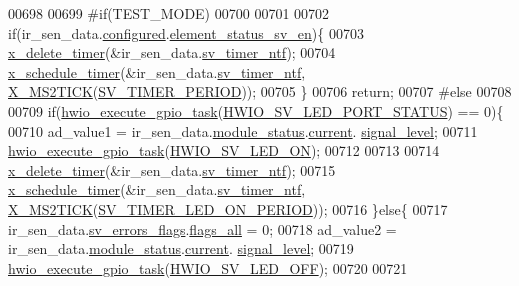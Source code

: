 \begin{DoxyCode}
00698 
00699 \textcolor{preprocessor}{#if(TEST\_MODE)}
00700 
00701 
00702     \textcolor{keywordflow}{if}(ir\_sen\_data.\hyperlink{a00023_a94b2d1f6ea4ab334c74d24984dd27843}{configured}.\hyperlink{a00021_afeb3f74725269028a60926f98890c22b}{element\_status\_sv\_en})\{
00703     \hyperlink{a00036_ab69e9af4cfa717e870d587906283635c}{x\_delete\_timer}(&ir\_sen\_data.\hyperlink{a00023_ada91b200053f2d93e3639dc4ee3415b4}{sv\_timer\_ntf});
00704     \hyperlink{a00036_a9e3befaa21e83f196f74201deed85346}{x\_schedule\_timer}(&ir\_sen\_data.\hyperlink{a00023_ada91b200053f2d93e3639dc4ee3415b4}{sv\_timer\_ntf},
      \hyperlink{a00036_a1732cd929c486b3a225824bb2b3dba36}{X\_MS2TICK}(\hyperlink{a00023_a8a535456285f4602701c814d7b69cc68}{SV\_TIMER\_PERIOD}));
00705     \}
00706     \textcolor{keywordflow}{return};
00707 \textcolor{preprocessor}{#else}
00708 
00709     \textcolor{keywordflow}{if}(\hyperlink{a00058_a0af9eae455fbdf4e77def5bfffa109cb}{hwio\_execute\_gpio\_task}(\hyperlink{a00058_ab1278d6ffe9c661f55b9f146f82b0be6}{HWIO\_SV\_LED\_PORT\_STATUS}) == 0)\{
00710     ad\_value1  = ir\_sen\_data.\hyperlink{a00023_a5a53c391562b059eb744ac679f3765ca}{module\_status}.\hyperlink{a00017_ab8af48cdbba92b3ae39c4470e53af944}{current}.
      \hyperlink{a00017_abcdf2bc0c2e5a14863938ae28c3bc96e}{signal\_level};
00711     \hyperlink{a00058_a0af9eae455fbdf4e77def5bfffa109cb}{hwio\_execute\_gpio\_task}(\hyperlink{a00058_aae186cdf37c0783bf64b0aed3f1e6eda}{HWIO\_SV\_LED\_ON});
00712 
00713 
00714     \hyperlink{a00036_ab69e9af4cfa717e870d587906283635c}{x\_delete\_timer}(&ir\_sen\_data.\hyperlink{a00023_ada91b200053f2d93e3639dc4ee3415b4}{sv\_timer\_ntf});
00715     \hyperlink{a00036_a9e3befaa21e83f196f74201deed85346}{x\_schedule\_timer}(&ir\_sen\_data.\hyperlink{a00023_ada91b200053f2d93e3639dc4ee3415b4}{sv\_timer\_ntf},
      \hyperlink{a00036_a1732cd929c486b3a225824bb2b3dba36}{X\_MS2TICK}(\hyperlink{a00023_a44e4917fdf9d2a3574a3dd34537d97a7}{SV\_TIMER\_LED\_ON\_PERIOD}));
00716     \}\textcolor{keywordflow}{else}\{
00717      ir\_sen\_data.\hyperlink{a00023_aaeec6b0609dba31393f337abf1cce3d3}{sv\_errors\_flags}.\hyperlink{a00022_a1caa87b00c878186140c3bac9c8acf3b}{flags\_all} = 0;
00718     ad\_value2  = ir\_sen\_data.\hyperlink{a00023_a5a53c391562b059eb744ac679f3765ca}{module\_status}.\hyperlink{a00017_ab8af48cdbba92b3ae39c4470e53af944}{current}.
      \hyperlink{a00017_abcdf2bc0c2e5a14863938ae28c3bc96e}{signal\_level};
00719     \hyperlink{a00058_a0af9eae455fbdf4e77def5bfffa109cb}{hwio\_execute\_gpio\_task}(\hyperlink{a00058_a8fe69ad7e533d2e88cec53c22a56f8fb}{HWIO\_SV\_LED\_OFF});
00720 
00721 

\end{DoxyCode}
